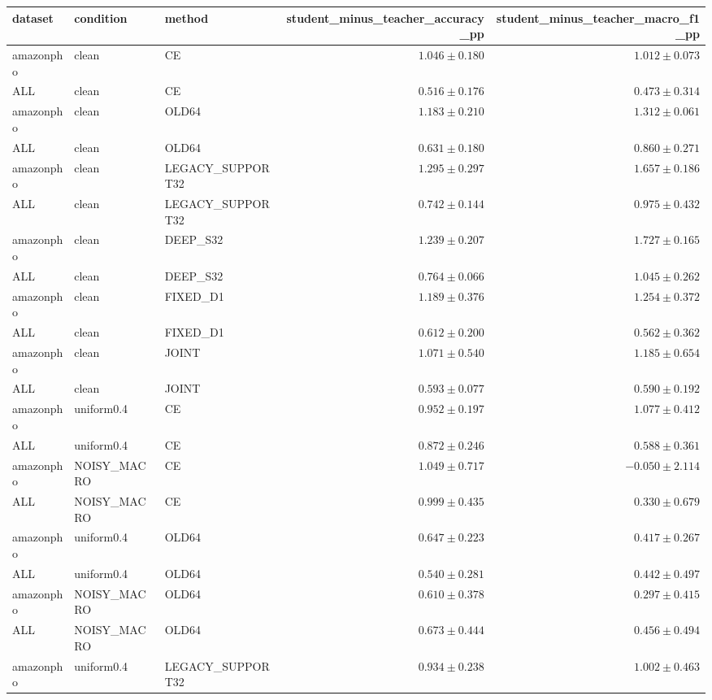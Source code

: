 \begin{longtable}{lllrr}
dataset & condition & method & student\_minus\_teacher\_accuracy\_pp & student\_minus\_teacher\_macro\_f1\_pp \\
\hline
amazonpho & clean & CE & $1.046 \pm 0.180$ & $1.012 \pm 0.073$ \\
ALL & clean & CE & $0.516 \pm 0.176$ & $0.473 \pm 0.314$ \\
amazonpho & clean & OLD64 & $1.183 \pm 0.210$ & $1.312 \pm 0.061$ \\
ALL & clean & OLD64 & $0.631 \pm 0.180$ & $0.860 \pm 0.271$ \\
amazonpho & clean & LEGACY\_SUPPORT32 & $1.295 \pm 0.297$ & $1.657 \pm 0.186$ \\
ALL & clean & LEGACY\_SUPPORT32 & $0.742 \pm 0.144$ & $0.975 \pm 0.432$ \\
amazonpho & clean & DEEP\_S32 & $1.239 \pm 0.207$ & $1.727 \pm 0.165$ \\
ALL & clean & DEEP\_S32 & $0.764 \pm 0.066$ & $1.045 \pm 0.262$ \\
amazonpho & clean & FIXED\_D1 & $1.189 \pm 0.376$ & $1.254 \pm 0.372$ \\
ALL & clean & FIXED\_D1 & $0.612 \pm 0.200$ & $0.562 \pm 0.362$ \\
amazonpho & clean & JOINT & $1.071 \pm 0.540$ & $1.185 \pm 0.654$ \\
ALL & clean & JOINT & $0.593 \pm 0.077$ & $0.590 \pm 0.192$ \\
amazonpho & uniform0.4 & CE & $0.952 \pm 0.197$ & $1.077 \pm 0.412$ \\
ALL & uniform0.4 & CE & $0.872 \pm 0.246$ & $0.588 \pm 0.361$ \\
amazonpho & NOISY\_MACRO & CE & $1.049 \pm 0.717$ & $-0.050 \pm 2.114$ \\
ALL & NOISY\_MACRO & CE & $0.999 \pm 0.435$ & $0.330 \pm 0.679$ \\
amazonpho & uniform0.4 & OLD64 & $0.647 \pm 0.223$ & $0.417 \pm 0.267$ \\
ALL & uniform0.4 & OLD64 & $0.540 \pm 0.281$ & $0.442 \pm 0.497$ \\
amazonpho & NOISY\_MACRO & OLD64 & $0.610 \pm 0.378$ & $0.297 \pm 0.415$ \\
ALL & NOISY\_MACRO & OLD64 & $0.673 \pm 0.444$ & $0.456 \pm 0.494$ \\
amazonpho & uniform0.4 & LEGACY\_SUPPORT32 & $0.934 \pm 0.238$ & $1.002 \pm 0.463$ \\

\end{longtable}
